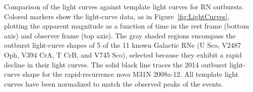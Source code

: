 \label{fig:RecurrentNovaLightCurveComparison}
Comparison of the \spock light curves against template light curves
for RN outbursts.  Colored markers show the \spock light-curve data,
as in Figure~\ref{fig:LightCurves}, plotting the apparent magnitude as
a function of time in the rest frame (bottom axis) and observer frame
(top axis). The gray shaded regions encompass the outburst light-curve
shapes of 5 of the 11 known Galactic RNe (U Sco, V2487 Oph, V394 CrA,
T CrB, and V745 Sco), selected because they exhibit a rapid decline in
their light curves\citep{Schaefer:2010}.  The solid black line traces
the 2014 outburst light-curve shape for the rapid-recurrence nova M31N
2008a-12\citep{Darnley:2014}.  All template light curves have been
normalized to match the observed peaks of the \spock events.

  
